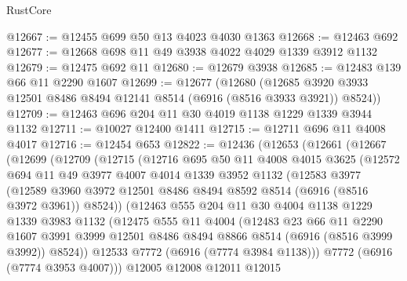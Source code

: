 \begin{lexlean}{RustCore}
\begin{coremodule}
@12667 := @12455 @699 @50 @13 @4023 @4030 @1363
@12668 := @12463 @692
@12677 := @12668 @698 @11 @49 @3938 @4022 @4029 @1339 @3912 @1132
@12679 := @12475 @692 @11
@12680 := @12679 @3938
@12685 := @12483 @139 @66 @11 @2290 @1607
@12699 := @12677
    (@12680 (@12685 @3920 @3933 @12501 @8486 @8494 @12141 @8514 (@6916 (@8516 @3933 @3921)) @8524))
@12709 := @12463 @696 @204 @11 @30 @4019 @1138 @1229 @1339 @3944 @1132
@12711 := @10027 @12400 @1411
@12715 := @12711 @696 @11 @4008 @4017
@12716 := @12454 @653
@12822 := @12436
    (@12653
      (@12661
        (@12667
          (@12699
            (@12709
              (@12715
                (@12716
                  @695
                  @50
                  @11
                  @4008
                  @4015
                  @3625
                  (@12572
                    @694
                    @11
                    @49
                    @3977
                    @4007
                    @4014
                    @1339
                    @3952
                    @1132
                    (@12583
                      @3977
                      (@12589
                        @3960
                        @3972
                        @12501
                        @8486
                        @8494
                        @8592
                        @8514
                        (@6916 (@8516 @3972 @3961))
                        @8524))
                    (@12463
                      @555
                      @204
                      @11
                      @30
                      @4004
                      @1138
                      @1229
                      @1339
                      @3983
                      @1132
                      (@12475
                        @555
                        @11
                        @4004
                        (@12483
                          @23
                          @66
                          @11
                          @2290
                          @1607
                          @3991
                          @3999
                          @12501
                          @8486
                          @8494
                          @8866
                          @8514
                          (@6916 (@8516 @3999 @3992))
                          @8524))
                      @12533
                      @7772
                      (@6916 (@7774 @3984 @1138)))
                    @7772
                    (@6916 (@7774 @3953 @4007)))
                  @12005
                  @12008
                  @12011
                  @12015

\end{coremodule}
\end{lexlean}
